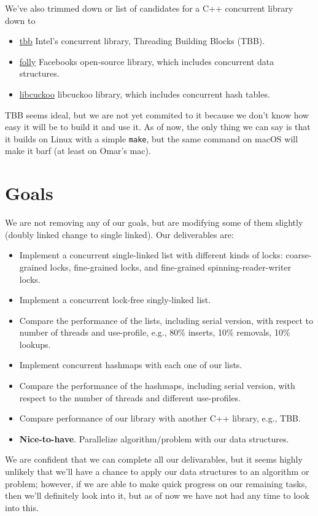 \documentclass[11pt]{article}
\begin{document}
We've also trimmed down or list of candidates for a C++ concurrent library down
to
\begin{itemize}
\item
\href{https://github.com/01org/tbb}{tbb} Intel's concurrent library, Threading
Building Blocks (TBB).
\item
\href{https://github.com/facebook/folly}{folly} Facebooks open-source library,
which includes concurrent data structures.
\item
\href{https://github.com/efficient/libcuckoo}{libcuckoo} libcuckoo library,
which includes concurrent hash tables.
\end{itemize}
TBB seems ideal, but we are not yet commited to it because we don't know how easy
it will be to build it and use it. As of now, the only thing we can say is that it
builds on Linux with a simple {\tt make}, but the same command on macOS will make
it barf (at least on Omar's mac).

\section*{Goals}
We are not removing any of our goals, but are modifying some of them slightly (doubly linked
change to single linked). Our deliverables are:

\begin{itemize}
\item
Implement a concurrent single-linked list with different kinds of locks:
coarse-grained locks, fine-grained locks, and fine-grained
spinning-reader-writer locks.
\item %
Implement a concurrent lock-free singly-linked list.
\item
Compare the performance of the lists, including serial version, with respect to
number of threads and use-profile, e.g., 80\% inserts, 10\% removals, 10\%
lookups.
\item
Implement concurrent hashmaps with each one of our lists.
\item
Compare the performance of the hashmaps, including serial version, with respect
to the number of threads and different use-profiles.
\item
Compare performance of our library with another C++ library, e.g., TBB.
\item
{\bf Nice-to-have}. Parallelize algorithm/problem with our data structures.
\end{itemize}

We are confident that we can complete all our delivarables, but it seems highly
unlikely that we'll have a chance to apply our data structures to an algorithm
or problem; however, if we are able to make quick progress on our remaining
tasks, then we'll definitely look into it, but as of now we have not had any
time to look into this.
\end{document}
